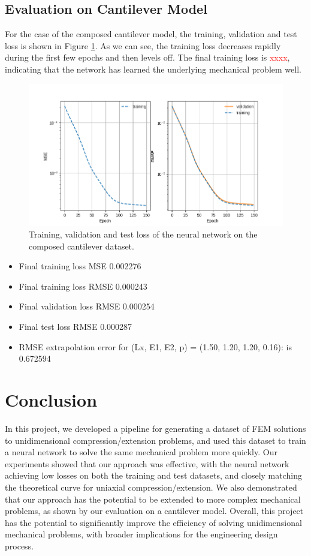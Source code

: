 \documentclass[11pt]{scrartcl} %
\begin{document}
\subsection{Evaluation on Cantilever Model}
For the case of the composed cantilever model, the training, validation and test loss is shown in Figure \ref{fig:composed_cantilever_loss}. As we can see, the training loss decreases rapidly during the first few epochs and then levels off. The final training loss is \textcolor{red}{xxxx}, indicating that the network has learned the underlying mechanical problem well.

\begin{figure}[h]
\centering
\includegraphics[width=1\textwidth]{Figures/Example2_losses.png}
\caption{Training, validation and test loss of the neural network on the composed cantilever dataset.}
\label{fig:composed_cantilever_loss}
\end{figure}


\begin{itemize}
\item Final training loss MSE 0.002276  
\item Final training loss RMSE 0.000243  
\item Final validation loss RMSE 0.000254  
\item Final test loss RMSE 0.000287  
\item RMSE extrapolation error for (Lx, E1, E2, p) = (1.50, 1.20, 1.20, 0.16): is 0.672594
\end{itemize}



\section{Conclusion}
In this project, we developed a pipeline for generating a dataset of FEM solutions to unidimensional compression/extension problems, and used this dataset to train a neural network to solve the same mechanical problem more quickly. Our experiments showed that our approach was effective, with the neural network achieving low losses on both the training and test datasets, and closely matching the theoretical curve for uniaxial compression/extension. We also demonstrated that our approach has the potential to be extended to more complex mechanical problems, as shown by our evaluation on a cantilever model. Overall, this project has the potential to significantly improve the efficiency of solving unidimensional mechanical problems, with broader implications for the engineering design process.
\end{document}
